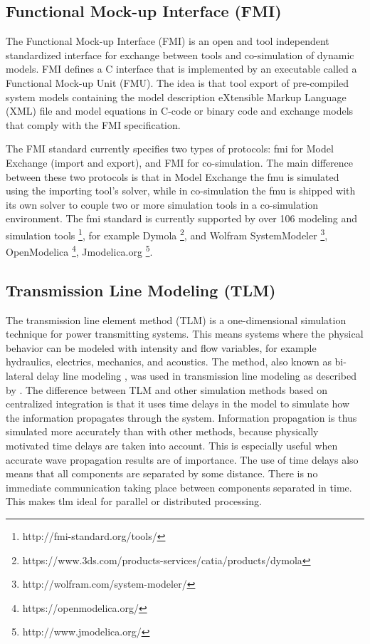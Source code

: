 \subsection{Functional Mock-up Interface (FMI)}
\label{sec:fmi}

The Functional Mock-up Interface (FMI) \cite{fmi,fmiblochwitz} is an open and tool independent standardized interface for exchange between tools and co-simulation of dynamic models. FMI defines a C interface that is implemented by an executable called a Functional Mock-up Unit (FMU). The idea is that tool export of pre-compiled system models containing the model description  eXtensible Markup Language (XML) file and model equations in C-code or binary code and exchange models that comply with the FMI specification. 

The FMI standard currently specifies two types of protocols: \acrshort{fmi} for Model Exchange (import and export), and FMI for co-simulation. The main difference between these two protocols is that in Model Exchange the \acrshort{fmu} is simulated using the importing tool's solver, while in co-simulation the \acrshort{fmu} is shipped with its own solver to couple two or more simulation tools in a co-simulation environment. 
The \acrshort{fmi} standard is currently supported by over 106 modeling and simulation tools \footnote{http://fmi-standard.org/tools/}, for example   Dymola \footnote{https://www.3ds.com/products-services/catia/products/dymola}, and Wolfram SystemModeler \footnote{http://wolfram.com/system-modeler/}, OpenModelica \footnote{https://openmodelica.org/}, Jmodelica.org \footnote{http://www.jmodelica.org/}.

\subsection{Transmission Line Modeling (TLM)}
\label{sec:tlm}

The transmission line element method (TLM) \cite{tlmkurs90,tlmkurs99,tlmcogan,tlmjohns} is a one-dimensional simulation technique for power transmitting systems. This means systems where the physical behavior can be modeled with intensity and flow variables, for example hydraulics, electrics, mechanics, and acoustics. The method, also known as bi-lateral delay line modeling \cite{tlmauslander}, was used in transmission line modeling as described by \cite{tlmjohns}. The difference between TLM and other simulation methods based on centralized integration is that it uses time delays in the model to simulate how the information propagates through the system. Information propagation is thus simulated more accurately than with other methods, because physically motivated time delays are taken into account. This is especially useful when accurate wave propagation results are of importance. The use of time delays also means that all components are separated by some distance. There is no immediate communication taking place between components separated in time. This makes \acrshort{tlm} ideal for parallel or distributed processing.


